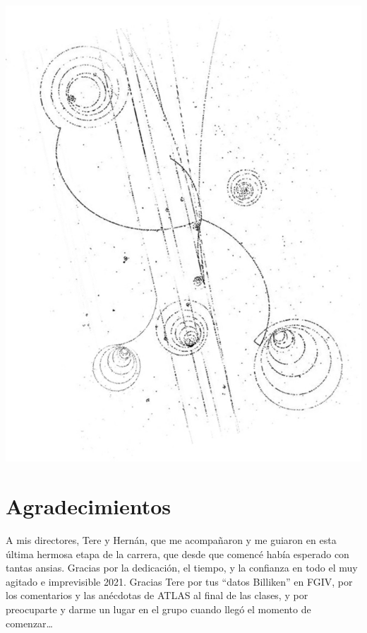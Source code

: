 \thispagestyle{empty}
{
    \begin{fullwidth}
        \flushright{}
        \hfill \includegraphics[width=\textwidth]{Assets/Images/Particle_tracks.pdf}
    \end{fullwidth}


    \section*{\normalsize Agradecimientos}

    A mis directores, Tere y Hernán, que me acompañaron y me guiaron en esta última hermosa etapa de la carrera, que desde que comencé había esperado con tantas ansias. Gracias por la dedicación, el tiempo, y la confianza en todo el muy agitado e imprevisible 2021. Gracias Tere por tus ``datos Billiken'' en FGIV, por los comentarios y las anécdotas de ATLAS al final de las clases, y por preocuparte y darme un lugar en el grupo cuando llegó el momento de comenzar\dots

}
